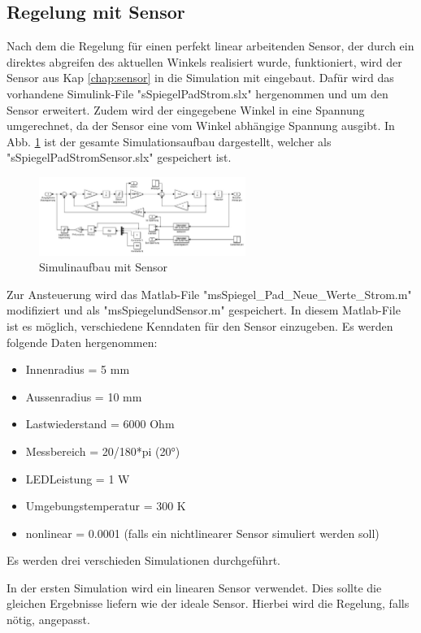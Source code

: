 \subsection{Regelung mit Sensor}
\label{chap:sensorregelung}
Nach dem die Regelung für einen perfekt linear arbeitenden Sensor, der durch ein direktes abgreifen des aktuellen Winkels realisiert wurde, funktioniert, wird der Sensor 
aus Kap \ref{chap:sensor} in die Simulation mit eingebaut.
Dafür wird das vorhandene Simulink-File "sSpiegelPadStrom.slx" hergenommen und um den Sensor erweitert.
Zudem wird der eingegebene Winkel in eine Spannung umgerechnet, da der Sensor eine vom Winkel abhängige Spannung ausgibt.
In Abb. \ref{fig:simusensor} ist der gesamte Simulationsaufbau dargestellt, welcher als "sSpiegelPadStromSensor.slx" gespeichert ist.
\begin{figure}[!h]
	\centering
	\includegraphics[width=0.6\textwidth]{sSpiegelPadStromSensor.jpg}
	\caption{Simulinaufbau mit Sensor}
	\label{fig:simusensor}
\end{figure}
Zur Ansteuerung wird das Matlab-File "msSpiegel_Pad_Neue_Werte_Strom.m" modifiziert und als "msSpiegelundSensor.m" gespeichert.
In diesem Matlab-File ist es möglich, verschiedene Kenndaten für den Sensor einzugeben.
Es werden folgende Daten hergenommen:
\begin{itemize}
\item Innenradius = 5 mm
\item Aussenradius = 10 mm
\item Lastwiederstand = 6000 Ohm
\item Messbereich = 20/180*pi (20°)
\item LEDLeistung = 1 W
\item Umgebungstemperatur = 300 K
\item nonlinear = 0.0001 (falls ein nichtlinearer Sensor simuliert werden soll)
\end{itemize}

Es werden drei verschieden Simulationen durchgeführt.

In der ersten Simulation wird ein linearen Sensor verwendet.
Dies sollte die gleichen Ergebnisse liefern wie der ideale Sensor.
Hierbei wird die Regelung, falls nötig, angepasst.

